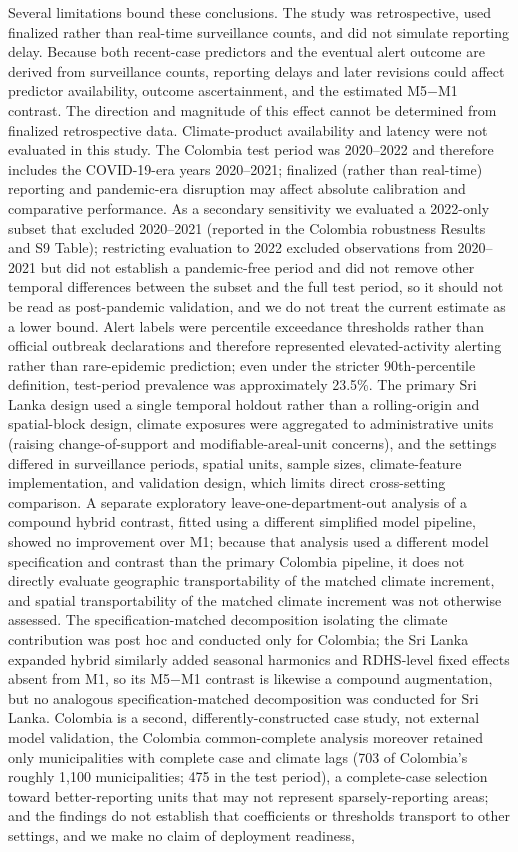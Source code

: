 \documentclass[11pt,a4paper]{article}
\begin{document}
Several limitations bound these conclusions. The study was retrospective, used finalized rather than real-time surveillance counts, and did not simulate reporting delay. Because both recent-case predictors and the eventual alert outcome are derived from surveillance counts, reporting delays and later revisions could affect predictor availability, outcome ascertainment, and the estimated M5$-$M1 contrast. The direction and magnitude of this effect cannot be determined from finalized retrospective data. Climate-product availability and latency were not evaluated in this study. The Colombia test period was 2020--2022 and therefore includes the COVID-19-era years 2020--2021; finalized (rather than real-time) reporting and pandemic-era disruption may affect absolute calibration and comparative performance. As a secondary sensitivity we evaluated a 2022-only subset that excluded 2020--2021 (reported in the Colombia robustness Results and S9 Table); restricting evaluation to 2022 excluded observations from 2020--2021 but did not establish a pandemic-free period and did not remove other temporal differences between the subset and the full test period, so it should not be read as post-pandemic validation, and we do not treat the current estimate as a lower bound. Alert labels were percentile exceedance thresholds rather than official outbreak declarations and therefore represented elevated-activity alerting rather than rare-epidemic prediction; even under the stricter 90th-percentile definition, test-period prevalence was approximately 23.5\%. The primary Sri Lanka design used a single temporal holdout rather than a rolling-origin and spatial-block design, climate exposures were aggregated to administrative units (raising change-of-support and modifiable-areal-unit concerns), and the settings differed in surveillance periods, spatial units, sample sizes, climate-feature implementation, and validation design, which limits direct cross-setting comparison. A separate exploratory leave-one-department-out analysis of a compound hybrid contrast, fitted using a different simplified model pipeline, showed no improvement over M1; because that analysis used a different model specification and contrast than the primary Colombia pipeline, it does not directly evaluate geographic transportability of the matched climate increment, and spatial transportability of the matched climate increment was not otherwise assessed. The specification-matched decomposition isolating the climate contribution was post hoc and conducted only for Colombia; the Sri Lanka expanded hybrid similarly added seasonal harmonics and RDHS-level fixed effects absent from M1, so its M5$-$M1 contrast is likewise a compound augmentation, but no analogous specification-matched decomposition was conducted for Sri Lanka. Colombia is a second, differently-constructed case study, not external model validation, the Colombia common-complete analysis moreover retained only municipalities with complete case and climate lags (703 of Colombia's roughly 1,100 municipalities; 475 in the test period), a complete-case selection toward better-reporting units that may not represent sparsely-reporting areas; and the findings do not establish that coefficients or thresholds transport to other settings, and we make no claim of deployment readiness, 
\end{document}
